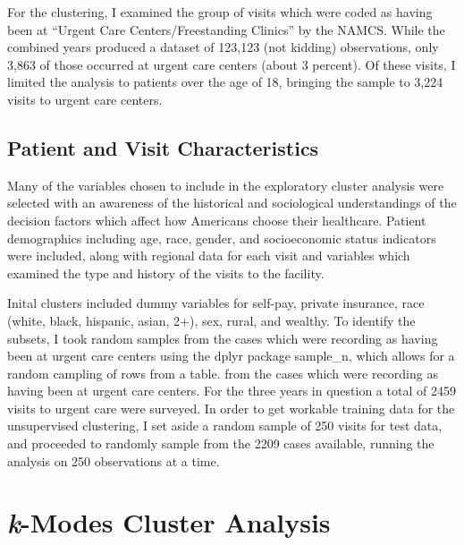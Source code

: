 \documentclass[12pt,twoside]{reedthesis}
\begin{document}
  For the clustering, I examined the group of visits which were coded as
  having been at ``Urgent Care Centers/Freestanding Clinics'' by the
  NAMCS. While the combined years produced a dataset of 123,123 (not
  kidding) observations, only 3,863 of those occurred at urgent care
  centers (about 3 percent). Of these visits, I limited the analysis to
  patients over the age of 18, bringing the sample to 3,224 visits to
  urgent care centers.
  
  \subsection{Patient and Visit
  Characteristics}\label{patient-and-visit-characteristics}
  
  Many of the variables chosen to include in the exploratory cluster
  analysis were selected with an awareness of the historical and
  sociological understandings of the decision factors which affect how
  Americans choose their healthcare. Patient demographics including age,
  race, gender, and socioeconomic status indicators were included, along
  with regional data for each visit and variables which examined the type
  and history of the visits to the facility.
  
  Inital clusters included dummy variables for self-pay, private
  insurance, race (white, black, hispanic, asian, 2+), sex, rural, and
  wealthy. To identify the subsets, I took random samples from the cases
  which were recording as having been at urgent care centers using the
  dplyr package sample\_n, which allows for a random campling of rows from
  a table. from the cases which were recording as having been at urgent
  care centers. For the three years in question a total of 2459 visits to
  urgent care were surveyed. In order to get workable training data for
  the unsupervised clustering, I set aside a random sample of 250 visits
  for test data, and proceeded to randomly sample from the 2209 cases
  available, running the analysis on 250 observations at a time.
  
  \section{\texorpdfstring{\emph{k}-Modes Cluster
  Analysis}{k-Modes Cluster Analysis}}\label{k-modes-cluster-analysis}
  
\end{document}
